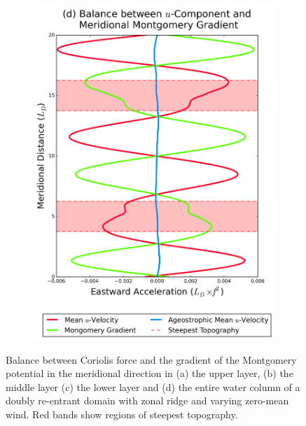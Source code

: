 \documentclass[12pt,a4paper]{report}
\begin{document}
\begin{figure}
\begin{subfigure}{0.46\linewidth}
 		\includegraphics[width=\linewidth ]{vgeo_4}
 		\label{fig:vgeototal}
 	\end{subfigure}
 	\caption{Balance between Coriolis force and the gradient
 		of the Montgomery potential in the meridional 
 		direction in (a) the upper layer, (b) the middle layer
 		(c) the lower layer and (d) the entire water column of 
 		a doubly re-entrant domain with 
 		zonal ridge and varying zero-mean wind. Red bands show regions of steepest topography. }
 	\label{fig:vgeo}
 \end{figure}
 
\end{document}
